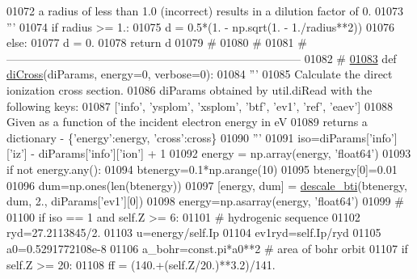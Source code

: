 \begin{DoxyCode}
{{{{{{{{{{{{01072 \textcolor{stringliteral}{    a radius of less than 1.0 (incorrect) results in a dilution factor of 0.}
01073 \textcolor{stringliteral}{    '''}
01074     \textcolor{keywordflow}{if} radius >= 1.:
01075         d = 0.5*(1. - np.sqrt(1. - 1./radius**2))
01076     \textcolor{keywordflow}{else}:
01077         d = 0.
01078     \textcolor{keywordflow}{return} d
01079     \textcolor{comment}{#}
01080     \textcolor{comment}{#}
01081     \textcolor{comment}{# ------------------------------------------------------------------------------}
01082     \textcolor{comment}{#}
\hypertarget{__chianti__tools_8py_source_l01083}{}\hyperlink{namespacepyneb_1_1utils_1_1__chianti__tools_a1d4803c6e3b7cbb996b9da3f763ab6ee}{01083} \textcolor{keyword}{def }\hyperlink{namespacepyneb_1_1utils_1_1__chianti__tools_a1d4803c6e3b7cbb996b9da3f763ab6ee}{diCross}(diParams, energy=0, verbose=0):
01084     \textcolor{stringliteral}{'''}
01085 \textcolor{stringliteral}{    Calculate the direct ionization cross section.}
01086 \textcolor{stringliteral}{    diParams obtained by util.diRead with the following keys:}
01087 \textcolor{stringliteral}{    ['info', 'ysplom', 'xsplom', 'btf', 'ev1', 'ref', 'eaev']}
01088 \textcolor{stringliteral}{    Given as a function of the incident electron energy in eV}
01089 \textcolor{stringliteral}{    returns a dictionary - \{'energy':energy, 'cross':cross\}}
01090 \textcolor{stringliteral}{    '''}
01091     iso=diParams[\textcolor{stringliteral}{'info'}][\textcolor{stringliteral}{'iz'}] - diParams[\textcolor{stringliteral}{'info'}][\textcolor{stringliteral}{'ion'}] + 1
01092     energy = np.array(energy, \textcolor{stringliteral}{'float64'})
01093     \textcolor{keywordflow}{if} \textcolor{keywordflow}{not} energy.any():
01094         btenergy=0.1*np.arange(10)
01095         btenergy[0]=0.01
01096         dum=np.ones(len(btenergy))
01097         [energy, dum] = \hyperlink{namespacepyneb_1_1utils_1_1__chianti__tools_a47075ba90f01cbd7a3dbd08115544214}{descale\_bti}(btenergy, dum, 2., diParams[\textcolor{stringliteral}{'ev1'}][0])
01098         energy=np.asarray(energy, \textcolor{stringliteral}{'float64'})
01099     \textcolor{comment}{#}
01100     \textcolor{keywordflow}{if} iso == 1 \textcolor{keywordflow}{and} self.Z >= 6:
01101         \textcolor{comment}{#  hydrogenic sequence}
01102         ryd=27.2113845/2.
01103         u=energy/self.Ip
01104         ev1ryd=self.Ip/ryd
01105         a0=0.5291772108e-8
01106         a\_bohr=const.pi*a0**2   \textcolor{comment}{# area of bohr orbit}
01107         \textcolor{keywordflow}{if} self.Z >= 20:
01108             ff = (140.+(self.Z/20.)**3.2)/141.
}}}}}}}}}}}}
\end{DoxyCode}
